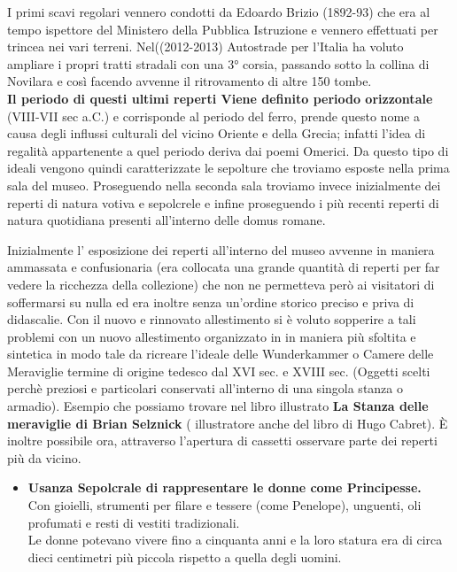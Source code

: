 \documentclass[hidelinks,12pt,a4paper]{article}
\begin{document}
\begin{flushleft}
		 I primi scavi regolari vennero condotti da Edoardo Brizio (1892-93) che era al tempo ispettore del Ministero della Pubblica Istruzione e vennero effettuati per trincea nei vari terreni.
		 Nel((2012-2013) Autostrade per l’Italia ha voluto ampliare i propri tratti stradali con una 3° corsia, passando sotto la collina di Novilara e così facendo avvenne il ritrovamento di altre 150 tombe.
		 \\ \textbf{Il periodo di questi ultimi reperti Viene definito periodo orizzontale}\\ (VIII-VII sec a.C.) e corrisponde al periodo del ferro, prende questo nome a causa degli influssi culturali del vicino Oriente e della Grecia; infatti l’idea di regalità appartenente a quel periodo deriva dai poemi Omerici. Da questo tipo di ideali vengono quindi caratterizzate le sepolture che troviamo esposte nella prima sala del museo.
		 Proseguendo nella seconda sala troviamo invece inizialmente dei reperti di natura votiva e sepolcrele e infine proseguendo i più recenti reperti di natura quotidiana presenti all'interno delle domus romane. 
		 
		  Inizialmente l' esposizione dei reperti all'interno del museo avvenne in maniera ammassata e confusionaria (era collocata una grande quantità di reperti per far vedere la ricchezza della collezione) che non ne permetteva però ai visitatori di soffermarsi su nulla ed era inoltre senza un’ordine storico preciso e priva di didascalie. Con il nuovo e rinnovato allestimento si è voluto sopperire a tali problemi con un nuovo allestimento organizzato in in maniera più sfoltita e sintetica in modo tale da ricreare l’ideale delle Wunderkammer o Camere delle Meraviglie termine di origine tedesco dal XVI sec. e XVIII sec. (Oggetti scelti perchè preziosi e particolari conservati all'interno di una singola stanza o armadio).
		  Esempio  che possiamo trovare nel libro illustrato \textbf{La Stanza delle meraviglie di Brian Selznick} ( illustratore anche del libro di Hugo Cabret).
		  È inoltre possibile ora, attraverso l'apertura di cassetti osservare parte dei reperti più da vicino.
		  
		\begin{itemize}
			\item \textbf{Usanza Sepolcrale di rappresentare le donne come Principesse.}\\
			Con gioielli, strumenti per filare e tessere (come Penelope), unguenti, oli profumati e resti di vestiti tradizionali.\\
			Le donne potevano vivere fino a cinquanta anni e la loro statura era di circa dieci centimetri più piccola rispetto a quella degli uomini.
			

\end{itemize}
\end{flushleft}
\end{document}
